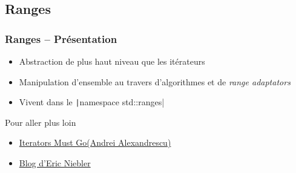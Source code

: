 \documentclass[C++.tex]{subfiles}
\begin{document}
\subsection*{Ranges}
\begin{frame}
	\frametitle{Ranges -- Présentation}
	\begin{itemize}
		\item Abstraction de plus haut niveau que les itérateurs
		\item Manipulation d'ensemble au travers d'algorithmes et de \textit{range adaptators}
		\item Vivent dans le \texttt|namespace std::ranges|

	\end{itemize}

	\begin{block}{Pour aller plus loin}
		\begin{itemize}
			\item \href{https://accu.org/content/conf2009/AndreiAlexandrescu_iterators-must-go.pdf}{Iterators Must Go\linklogo (Andrei Alexandrescu)}
			\item \href{http://ericniebler.com/}{Blog d'Eric Niebler\linklogo}
		\end{itemize}
	\end{block}

\end{frame}
\end{document}
